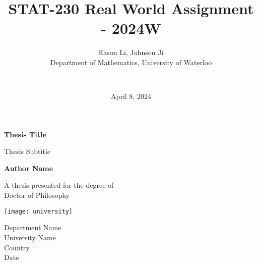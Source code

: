 \documentclass{article}
\title{STAT-230 Real World Assignment - 2024W}
\author{
    Eason Li, Johnson Ji \\
    Department of Mathematics, University of Waterloo \and \\
}
\date{April 8, 2024} %
\begin{document}
\begin{titlepage}
    \begin{center}
        \vspace*{1cm}
            
        \Huge
        \textbf{Thesis Title}
            
        \vspace{0.5cm}
        \LARGE
        Thesis Subtitle
            
        \vspace{1.5cm}
            
        \textbf{Author Name}
            
        \vfill
            
        A thesis presented for the degree of\\
        Doctor of Philosophy
            
        \vspace{0.8cm}
            
        \texttt{[image: university]}
            
        \Large
        Department Name\\
        University Name\\
        Country\\
        Date
            
    \end{center}
\end{titlepage}
\end{document}
